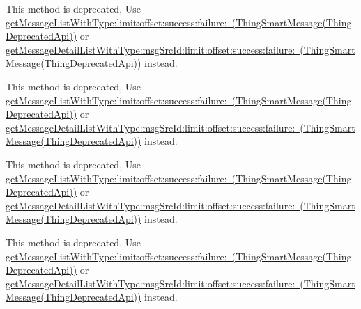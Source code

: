 \begin{DoxyRefList}
\label{deprecated__deprecated000180}%
%
This method is deprecated, Use \mbox{\hyperlink{category_thing_smart_message_07_thing_deprecated_api_08_ada5616d3a613a6453fe4208ef875df7a}{get\+Message\+List\+With\+Type\+:limit\+:offset\+:success\+:failure\+: (\+Thing\+Smart\+Message(\+Thing\+Deprecated\+Api))}} or \mbox{\hyperlink{category_thing_smart_message_07_thing_deprecated_api_08_a63f107a2e407d2a7bd110b38b716129b}{get\+Message\+Detail\+List\+With\+Type\+:msg\+Src\+Id\+:limit\+:offset\+:success\+:failure\+: (\+Thing\+Smart\+Message(\+Thing\+Deprecated\+Api))}} instead.  
\item[(Thing\+Deprecated\+Api) Member \mbox{\hyperlink{category_thing_smart_message_07_thing_deprecated_api_08_a4dd9bf77d4738a532e8919a949b6136c}{\mbox{[}Thing\+Smart\+Message(Thing\+Deprecated\+Api) get\+Message\+List\+:offset\+:success\+:failure\+:\mbox{]}}} ]\label{deprecated__deprecated000181}%
%
This method is deprecated, Use \mbox{\hyperlink{category_thing_smart_message_07_thing_deprecated_api_08_ada5616d3a613a6453fe4208ef875df7a}{get\+Message\+List\+With\+Type\+:limit\+:offset\+:success\+:failure\+: (\+Thing\+Smart\+Message(\+Thing\+Deprecated\+Api))}} or \mbox{\hyperlink{category_thing_smart_message_07_thing_deprecated_api_08_a63f107a2e407d2a7bd110b38b716129b}{get\+Message\+Detail\+List\+With\+Type\+:msg\+Src\+Id\+:limit\+:offset\+:success\+:failure\+: (\+Thing\+Smart\+Message(\+Thing\+Deprecated\+Api))}} instead. 

\label{deprecated__deprecated000174}%
%
This method is deprecated, Use \mbox{\hyperlink{category_thing_smart_message_07_thing_deprecated_api_08_ada5616d3a613a6453fe4208ef875df7a}{get\+Message\+List\+With\+Type\+:limit\+:offset\+:success\+:failure\+: (\+Thing\+Smart\+Message(\+Thing\+Deprecated\+Api))}} or \mbox{\hyperlink{category_thing_smart_message_07_thing_deprecated_api_08_a63f107a2e407d2a7bd110b38b716129b}{get\+Message\+Detail\+List\+With\+Type\+:msg\+Src\+Id\+:limit\+:offset\+:success\+:failure\+: (\+Thing\+Smart\+Message(\+Thing\+Deprecated\+Api))}} instead. 

\label{deprecated__deprecated000195}%
%
This method is deprecated, Use \mbox{\hyperlink{category_thing_smart_message_07_thing_deprecated_api_08_ada5616d3a613a6453fe4208ef875df7a}{get\+Message\+List\+With\+Type\+:limit\+:offset\+:success\+:failure\+: (\+Thing\+Smart\+Message(\+Thing\+Deprecated\+Api))}} or \mbox{\hyperlink{category_thing_smart_message_07_thing_deprecated_api_08_a63f107a2e407d2a7bd110b38b716129b}{get\+Message\+Detail\+List\+With\+Type\+:msg\+Src\+Id\+:limit\+:offset\+:success\+:failure\+: (\+Thing\+Smart\+Message(\+Thing\+Deprecated\+Api))}} instead. 


\end{DoxyRefList}
